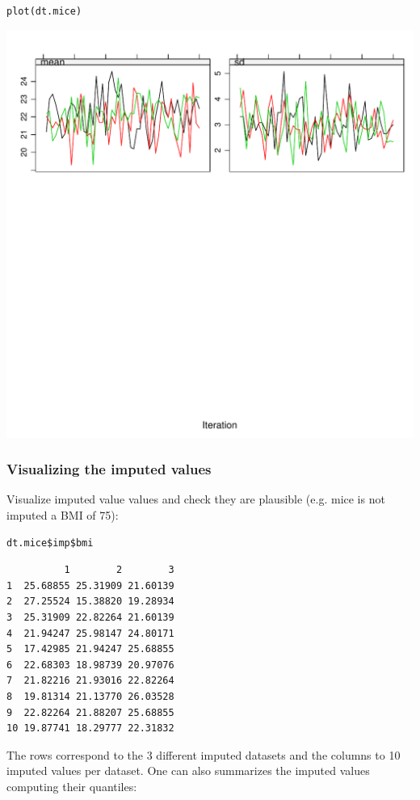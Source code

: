 \documentclass[12pt]{article}
\begin{document}
\lstset{language=r,label= ,caption= ,captionpos=b,numbers=none}
\begin{lstlisting}
plot(dt.mice)
\end{lstlisting}

\begin{center}
\includegraphics[width=.9\linewidth]{./traceCVimputed.pdf}
\end{center}

\subsubsection{Visualizing the imputed values}
\label{sec:org569670e}
Visualize imputed value values and check they are plausible (e.g. mice
is not imputed a BMI of 75):
\lstset{language=r,label= ,caption= ,captionpos=b,numbers=none}
\begin{lstlisting}
dt.mice$imp$bmi
\end{lstlisting}

\begin{verbatim}
          1        2        3
1  25.68855 25.31909 21.60139
2  27.25524 15.38820 19.28934
3  25.31909 22.82264 21.60139
4  21.94247 25.98147 24.80171
5  17.42985 21.94247 25.68855
6  22.68303 18.98739 20.97076
7  21.82216 21.93016 22.82264
8  19.81314 21.13770 26.03528
9  22.82264 21.88207 25.68855
10 19.87741 18.29777 22.31832
\end{verbatim}

The rows correspond to the 3 different imputed datasets and the
columns to 10 imputed values per dataset. One can also summarizes the
imputed values computing their quantiles:
\end{document}
